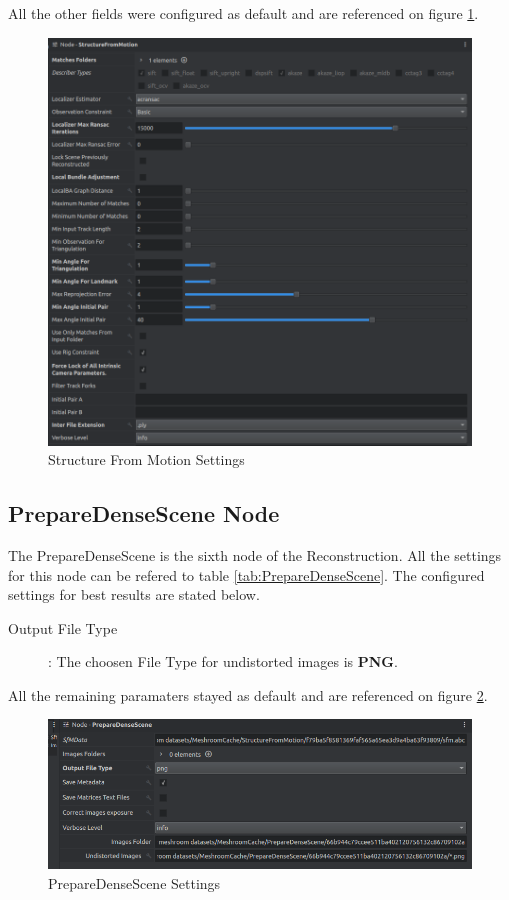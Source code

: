 \documentclass[12pt]{report}
\begin{document}
All the other fields were configured as default and are referenced on figure \ref{fig:SFM_set tings}.
\begin{figure}[H]%
  \centering
 \includegraphics[width=1\textwidth]{SFM_settings.png}
\caption{Structure From Motion Settings}
\label{fig:SFM_set tings} 
\end{figure}

\newpage
\subsection*{PrepareDenseScene Node}
The PrepareDenseScene is the sixth node of the Reconstruction.  All the settings for this node can be refered to table \ref{tab:PrepareDenseScene}.
The configured settings for best results are stated below. 

\begin{description}
  \item[Output File Type]: The choosen File Type for undistorted images is \textbf{PNG}.
\end{description}


All the remaining paramaters stayed as default and are referenced on figure \ref{fig:PrepareDepthSense}.
\begin{figure}[H]%
  \centering
 \includegraphics[width=1\textwidth]{PrepareDenseScene.png}
\caption{PrepareDenseScene Settings}
\label{fig:PrepareDepthSense} 
\end{figure}
\end{document}
